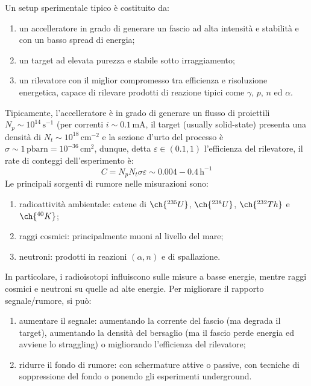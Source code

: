 Un setup sperimentale tipico è costituito da:
\begin{enumerate}
	\item un accelleratore in grado di generare un fascio ad alta intensità e stabilità e con un basso spread di energia;
	\item un target ad elevata purezza e stabile sotto irraggiamento;
	\item un rilevatore con il miglior compromesso tra efficienza e risoluzione energetica, capace di rilevare prodotti di reazione tipici come $ \gamma $, $ p $, $ n $ ed $ \alpha $.
\end{enumerate}
Tipicamente, l'accelleratore è in grado di generare un flusso di proiettili $ N_p \sim 10^{14} \,\text{s}^{-1} $ (per correnti $ i \sim 0.1 \,\text{mA} $, il target (usually solid-state) presenta una densità di $ N_t \sim 10^{18} \,\text{cm}^{-2} $ e la sezione d'urto del processo è $ \sigma \sim 1 \,\text{pbarn} = 10^{-36}  \,\text{cm}^2 $, dunque, detta $ \varepsilon \in \left( 0.1 , 1 \right) $ l'efficienza del rilevatore, il rate di conteggi dell'esperimento è:
\begin{equation*}
	C = N_p N_t \sigma \varepsilon \sim 0.004 - 0.4 \,\text{h}^{-1}
\end{equation*}
Le principali sorgenti di rumore nelle misurazioni sono:
\begin{enumerate}
	\item radioattività ambientale: catene di $ \ch{^{235} U} $, $ \ch{^{238} U} $, $ \ch{^{232} Th} $ e $ \ch{^{40} K} $;
	\item raggi cosmici: principalmente muoni al livello del mare;
	\item neutroni: prodotti in reazioni $ \left( \alpha, n \right) $ e di spallazione.
\end{enumerate}
In particolare, i radioisotopi influiscono sulle misure a basse energie, mentre raggi cosmici e neutroni su quelle ad alte energie. Per migliorare il rapporto segnale/rumore, si può:
\begin{enumerate}
	\item aumentare il segnale: aumentando la corrente del fascio (ma degrada il target), aumentando la densità del bersaglio (ma il fascio perde energia ed avviene lo straggling) o migliorando l'efficienza del rilevatore;
	\item ridurre il fondo di rumore: con schermature attive o passive, con tecniche di soppressione del fondo o ponendo gli esperimenti underground.
\end{enumerate}
